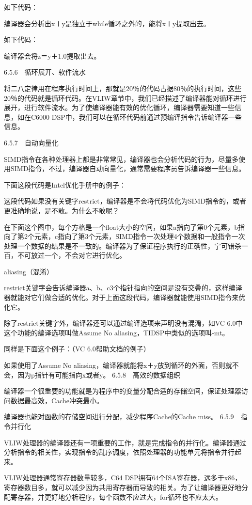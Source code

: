 \documentclass[12pt,UTF8]{ctexbook}
\begin{document}
如下代码：

编译器会分析出x＋y是独立于while循环之外的，能将x＋y提取出去。

如下代码：

编译器会将z＝y＋1.0提取出去。

6.5.6　循环展开、软件流水

将二八定律用在程序执行时间上，那就是20％的代码占据80％的执行时间，这些20％的代码就是循环代码。在VLIW章节中，我们已经描述了编译器能对循环进行展开，进行软件流水。为了使编译器能有效的优化循环，编译器需要知道一些信息，如在C6000 DSP中，我们可以在循环代码前通过预编译指令告诉编译器一些信息。

6.5.7　自动向量化

SIMD指令在各种处理器上都是非常常见，编译器也会分析代码的行为，尽量多使用SIMD指令，不过，编译器自动向量化，通常需要程序员告诉编译器一些信息。

下面这段代码是Intel优化手册中的例子：

这段代码如果没有关键字restrict，编译器是不会将代码优化为SIMD指令的，或者更准确地说，是不敢。为什么不敢呢？

在下面这个图中，每个方格是一个float大小的空间，如果a指向了第0个元素，b指向了第2个元素，c指向了第3个元素，SIMD指令一次处理4个数据和一般指令一次处理一个数据的结果是不一致的。编译器为了保证程序执行的正确性，宁可错杀一百，不可放过一个，不会对它进行优化。

aliasing（混淆）

restrict关键字会告诉编译器a、b、c3个指针指向的空间是没有交叠的，这样编译器就能对它们做合适的优化。对于上面这段代码，编译器就能使用SIMD指令来优化它。

除了restrict关键字外，编译器还可以通过编译选项来声明没有混淆，如VC 6.0中这个功能的编译选项叫做Assume No aliasing，TIDSP中类似的选项叫-mt。

同样是下面这个例子：（VC 6.0帮助文档的例子）

如果使用了Assume No aliasing，编译器就能将x＋y放到循环的外面，否则就不会，因为p指针有可能指向x或者y。
6.5.8　高效的数据组织

编译器一个很重要的功能就是为程序中的变量分配合适的存储空间，保证处理器访问数据最高效，Cache冲突最小。

编译器也能对函数的存储空间进行分配，减少程序Cache的Cache miss。
6.5.9　指令并行化

VLIW处理器的编译器还有一项重要的工作，就是完成指令的并行化。编译器通过分析指令的相关性，实现指令的乱序调度，依照处理器的功能单元将指令并行起来。

VLIW处理器通常寄存器数量较多，C64 DSP拥有64个ISA寄存器，远多于x86，寄存器数目多，就可以减少因为共用寄存器而导致的相关。为了让编译器更好地分配寄存器，并更好地分析程序，每个函数不应过大，for循环也不应太大。
\end{document}
